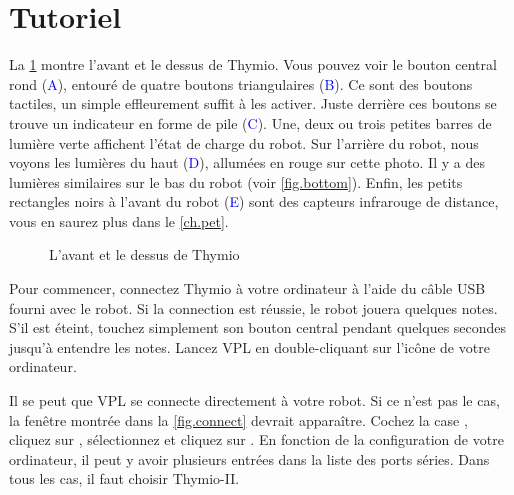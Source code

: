 \part{Tutoriel}


La \cref{fig.front} montre l'avant et le dessus de Thymio.
Vous pouvez voir le bouton central rond (\textcolor{blue}{A}), entouré de quatre boutons triangulaires (\textcolor{blue}{B}).
Ce sont des boutons tactiles, un simple effleurement suffit à les activer.
Juste derrière ces boutons se trouve un indicateur en forme de pile (\textcolor{blue}{C}).
Une, deux ou trois petites barres de lumière verte affichent l'état de charge du robot.
Sur l'arrière du robot, nous voyons les lumières du haut (\textcolor{blue}{D}), allumées en rouge sur cette photo.
Il y a des lumières similaires sur le bas du robot (voir \cref{fig.bottom}).
Enfin, les petits rectangles noirs à l'avant du robot (\textcolor{blue}{E}) sont des capteurs infrarouge de distance, vous en saurez plus dans le \cref{ch.pet}.

\begin{figure}[h]
\begin{center}
\caption{L'avant et le dessus de Thymio}\label{fig.front}
\end{center}
\end{figure} 


Pour commencer, connectez Thymio à votre ordinateur à l'aide du câble USB fourni avec le robot.
Si la connection est réussie, le robot jouera quelques notes.
S'il est éteint, touchez simplement son bouton central pendant quelques secondes jusqu'à entendre les notes.
Lancez VPL en double-cliquant sur l'icône  de votre ordinateur.



Il se peut que VPL se connecte directement à votre robot.
Si ce n'est pas le cas, la fenêtre montrée dans la \cref{fig.connect} devrait apparaître.
Cochez la case , cliquez sur , sélectionnez  et cliquez sur .
En fonction de la configuration de votre ordinateur, il peut y avoir plusieurs entrées dans la liste des ports séries.
Dans tous les cas, il faut choisir Thymio-II.

